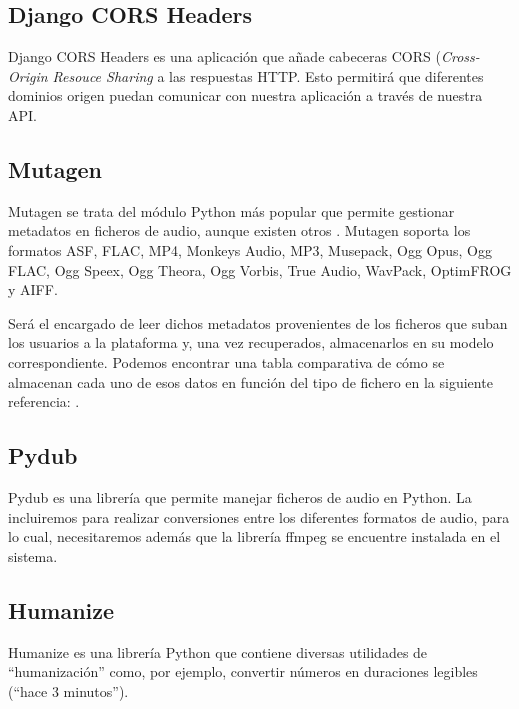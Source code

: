 \subsection{Django CORS Headers}

Django CORS Headers \cite{DjCORS} es una aplicación que añade cabeceras CORS (\textit{Cross-Origin Resouce Sharing} a las respuestas HTTP. Esto permitirá que diferentes dominios origen puedan comunicar con nuestra aplicación a través de nuestra API.

\subsection{Mutagen}
Mutagen \cite{Mutagen} se trata del módulo Python más popular que permite gestionar metadatos en ficheros de audio, aunque existen otros \cite{PUMID3H}. Mutagen soporta los formatos ASF, FLAC, MP4, Monkey\textquotesingle s Audio, MP3, Musepack, Ogg Opus, Ogg FLAC, Ogg Speex, Ogg Theora, Ogg Vorbis, True Audio, WavPack, OptimFROG y AIFF.

Será el encargado de leer dichos metadatos provenientes de los ficheros que suban los usuarios a la plataforma y, una vez recuperados, almacenarlos en su modelo correspondiente. Podemos encontrar una tabla comparativa de cómo se almacenan cada uno de esos datos en función del tipo de fichero en la siguiente referencia: \cite{TMMT}.

\subsection{Pydub}
Pydub \cite{pydub} es una librería que permite manejar ficheros de audio en Python. La incluiremos para realizar conversiones entre los diferentes formatos de audio, para lo cual, necesitaremos además que la librería ffmpeg \cite{ffmpeg} se encuentre instalada en el sistema.

\subsection{Humanize}

Humanize es una librería Python que contiene diversas utilidades de ``humanización'' como, por ejemplo, convertir números en duraciones legibles (``hace 3 minutos'').